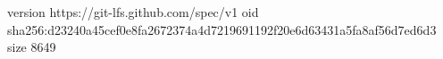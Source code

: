 version https://git-lfs.github.com/spec/v1
oid sha256:d23240a45cef0e8fa2672374a4d7219691192f20e6d63431a5fa8af56d7ed6d3
size 8649
